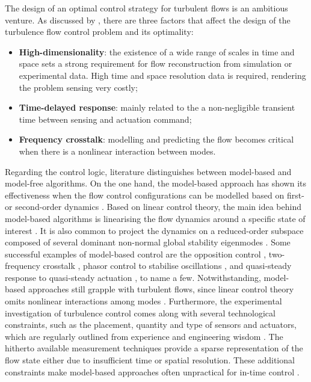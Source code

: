 The design of an optimal control strategy for turbulent flows is an ambitious venture. As discussed by \citet{cornejomacedaPhD}, there are three factors that affect the design of the turbulence flow control problem and its optimality:
%
\begin{itemize}
    \item \textbf{High-dimensionality}: the existence of a wide range of scales in time and space sets a strong requirement for flow reconstruction from simulation or experimental data. High time and space resolution data is required, rendering the problem sensing very costly;
    \item \textbf{Time-delayed response}: mainly related to the a non-negligible transient time between sensing and actuation command;
    \item \textbf{Frequency crosstalk}: modelling and predicting the flow becomes critical when there is a nonlinear interaction between modes.
\end{itemize}
%
Regarding the control logic, literature distinguishes between model-based and model-free algorithms. On the one hand, the model-based approach has shown its effectiveness when the flow control configurations can be modelled based on first- or second-order dynamics \citep{Rowley2006control}. Based on linear control theory, the main idea behind model-based algorithms is linearising the flow dynamics around a specific state of interest \citep{Kim2007linearcontrol,Sipp2010linearcontrol}. It is also common to project the dynamics on a reduced-order subspace composed of several dominant non-normal global stability eigenmodes \citep{akervik2007galerkin}. Some successful examples of model-based control are the opposition control \citep{Choi1994, Fukagata2003oppcontrol}, two-frequency crosstalk \citep{Glezer2005control,luchtenburg2009galerkin}, phasor control to stabilise oscillations \citep{pastoor2008control}, and quasi-steady response to quasi-steady actuation \citep{Pfeiffer2018robustcontrol}, to name a few. Notwithstanding, model-based approaches still grapple with turbulent flows, since linear control theory omits nonlinear interactions among modes \citep{BruntonNoack2015review}. Furthermore, the experimental investigation of turbulence control comes along with several technological constraints, such as the placement, quantity and type of sensors and actuators, which are regularly outlined from experience and engineering wisdom \citep{Cattafesta2011revFC}. The hitherto available measurement techniques provide a sparse representation of the flow state either due to insufficient time or spatial resolution. These additional constraints make model-based approaches often unpractical for in-time control \citep{cornejomacedaPhD}.


